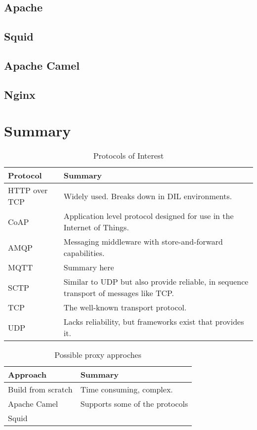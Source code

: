 \subsection{Apache}

\subsection{Squid}

\subsection{Apache Camel}

\subsection{Nginx}


\section{Summary}


\begin{table}[h]
\begin{tabularx}{\textwidth}{| X | X |}
\hline
  \textbf{Protocol} & \textbf{Summary} \\ \hline
  HTTP over TCP & Widely used. Breaks down in DIL environments.\\ \hline
  CoAP & Application level protocol designed for use in the Internet of Things. \\ \hline
  AMQP & Messaging middleware with store-and-forward capabilities.\\ \hline
  MQTT & Summary here\\ \hline
  SCTP & Similar to UDP but also provide reliable, in sequence transport of messages like TCP. \\ \hline
  TCP & The well-known transport protocol. \\ \hline
  UDP & Lacks reliability, but frameworks exist that provides it. \\ \hline
\end{tabularx}
\caption{Protocols of Interest}
\end{table}



\begin{table}
    \begin{tabular}{|l|l|}
    \hline
    \textbf{Approach}          & \textbf{Summary}     \\ \hline
    Build from scratch & Time consuming, complex.       \\ \hline
    Apache Camel      & Supports some of the protocols \\ \hline
    Squid      & \\ \hline
    \end{tabular}
    \caption {Possible proxy approches}
\end{table}
